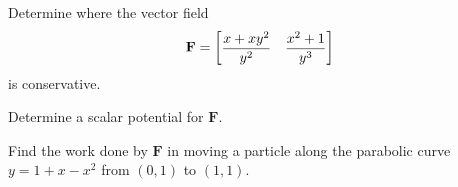 \documentclass[boxes,printing,blanks]{gsypset}
\begin{document}
	\begin{problem}[6.3.33]
		\begin{subproblems}
			\subproblem 
				Determine where the vector field
				\[
					\mathbf{F} = \begin{bmatrix}\dfrac{x + xy^2}{y^2} & \dfrac{x^2 + 1}{y^3}\end{bmatrix}
				\]
				is conservative.
				\begin{solution}
					
				\end{solution}
			\subproblem Determine a scalar potential for $\mathbf{F}$.
				\begin{solution}
					
				\end{solution}
			\subproblem 
				Find the work done by $\mathbf{F}$ in moving a particle along the parabolic curve
				$y = 1 + x - x^2$ from $(0, 1)$ to $(1, 1)$.
				\begin{solution}
					
				\end{solution}
		\end{subproblems}
	\end{problem}
\end{document}
